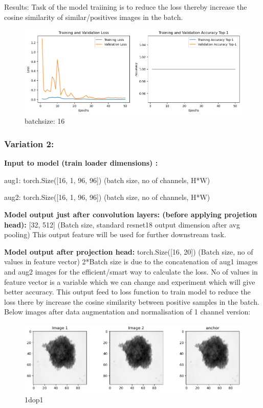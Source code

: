 \documentclass[12pt,twoside,a4paper,parskip]{scrbook} %
\begin{document}
Results:
Task of the model traiining is to reduce the loss thereby increase the cosine similarity of similar/positives images in the batch.
\begin{figure}[H]
  \centering
  \includegraphics[width=0.9\linewidth]{figures/image.png} %
  \caption{batchsize: 16}
  \label{fig:batch 16}
\end{figure}
\subsubsection{Variation 2:}
\textbf{Input to model (train loader dimensions) :} 

  aug1: torch.Size([16, 1, 96, 96])        (batch size, no of channels, H*W)

  aug2: torch.Size([16, 1, 96, 96])        (batch size, no of channels, H*W)

  \textbf{Model output just after convolution layers: (before applying projetion head):} [32, 512]  (Batch size, standard resnet18 output dimension after avg pooling)   This output feature will be used for further downstream task.

  \textbf{Model output after projection head:} torch.Size([16, 20]) (Batch size, no of values in feature vector)  2*Batch size is due to the concatenation of aug1 images and aug2 images for the efficient/smart way to calculate the loss. No of values in feature vector is a variable which we can change and experiment which will give better accuracy. This output feed to loss function to train model to reduce the loss there by increase the cosine similarity between positive samples in the batch.
Below images after data augmentation and normalisation of 1 channel version:
\begin{figure}[H]
  \centering
  \includegraphics[width=0.9\linewidth]{figures/1dop1.png} %
  \caption{1dop1}
  \label{fig:1doutput1}
\end{figure}
\end{document}

